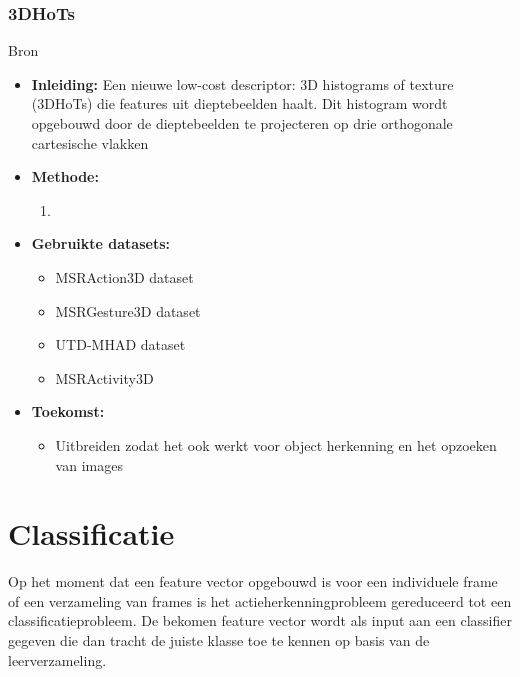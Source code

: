 \subsection{3DHoTs}
 Bron \cite{Chen2017}
\begin{itemize}
	\item \textbf{Inleiding:} Een nieuwe low-cost descriptor: 3D histograms of texture (3DHoTs) die features uit dieptebeelden haalt. Dit histogram wordt opgebouwd door de dieptebeelden te projecteren op drie orthogonale cartesische vlakken
	\item \textbf{Methode:} 
	\begin{enumerate}
		\item
	\end{enumerate}
	\item \textbf{Gebruikte datasets:}
	\begin{itemize}
		\item MSRAction3D dataset
		\item MSRGesture3D dataset
		\item UTD-MHAD dataset
		\item MSRActivity3D
	\end{itemize}
	\item \textbf{Toekomst:}
	\begin{itemize}
		\item Uitbreiden zodat het ook werkt voor object herkenning en het opzoeken van images
	\end{itemize}
\end{itemize}



\chapter{Classificatie}
\label{ch:classificatie}
Op het moment dat een feature vector opgebouwd is voor een individuele frame of een verzameling van frames is het actieherkenningprobleem gereduceerd tot een classificatieprobleem. De bekomen feature vector wordt als input aan een classifier gegeven die dan tracht de juiste klasse toe te kennen op basis van de leerverzameling. 

